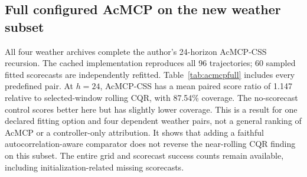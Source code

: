 \subsection{Full configured AcMCP on the new weather subset}\label{sec:acmcpfull}
All four weather archives complete the author's 24-horizon AcMCP-CSS recursion.
The cached implementation reproduces all 96 trajectories; 60 sampled fitted scorecasts
are independently refitted. Table~\ref{tab:acmcpfull} includes every predefined pair.
At $h=24$, AcMCP-CSS has a mean paired score ratio of 1.147 relative to selected-window
rolling CQR, with 87.54\% coverage. The no-scorecast control scores better here but
has slightly lower coverage. This is a result for one declared fitting option and
four dependent weather pairs, not a general ranking of AcMCP or a controller-only
attribution. It shows that adding a faithful autocorrelation-aware comparator does
not reverse the near-rolling CQR finding on this subset. The entire grid and scorecast
success counts remain available, including initialization-related missing scorecasts.

\begin{table}[!htbp]\centering\small
\caption{Complete-configuration weather comparison, four pairs per horizon. IS ratio
averages each method's score divided by its matched validation-selected rolling CQR
score. Coverage is percent, Local is absolute coverage error in percentage points.
Ratios do not remove differences in native versus signed-error information.}
\label{tab:acmcpfull}
\end{table}
